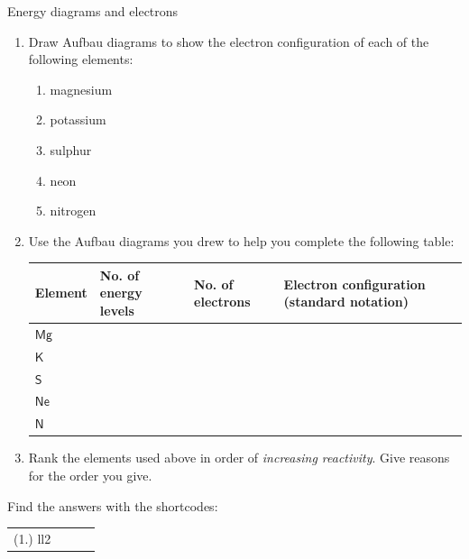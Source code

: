 \begin{exercises}{Energy diagrams and electrons}
            \nopagebreak
        \label{m38741*id260063}\begin{enumerate}[noitemsep, label=\textbf{\arabic*}. ] 
            \label{m38741*uid106}\item Draw Aufbau diagrams to show the electron configuration of each of the following elements:
\label{m38741*id260079}\begin{enumerate}[noitemsep, label=\textbf{\alph*}. ] 
            \label{m38741*uid107}\item magnesium
\label{m38741*uid108}\item potassium
\label{m38741*uid109}\item sulphur
\label{m38741*uid110}\item neon
\label{m38741*uid111}\item nitrogen
\end{enumerate}
        \label{m38741*uid112}\item Use the Aufbau diagrams you drew to help you complete the following table:
       \begin{center}
\begin{tabular}{|p{1.6cm}|p{2.6cm}|p{2.6cm}|p{2.6cm}|}\hline
\textbf{Element} & \textbf{No. of energy levels} & \textbf{No. of electrons}  & \textbf{Electron configuration (standard notation)}\\\hline
$\mathsf{Mg}$ & &  & \\\hline
$\mathsf{K}$ & &  & \\\hline
$\mathsf{S}$ & & & \\\hline
$\mathsf{Ne}$ &  & & \\\hline
$\mathsf{N}$ & & & \\\hline
\end{tabular}
\end{center}    

  \label{m38741*uid113}\item Rank the elements used above in order of \textsl{increasing reactivity}. Give reasons for the order you give.
 \end{enumerate}
 Find the answers with the shortcodes:
 \par \begin{tabular}[h]{cccc}
 (1.) ll2 & & & \end{tabular}
\end{exercises}            
